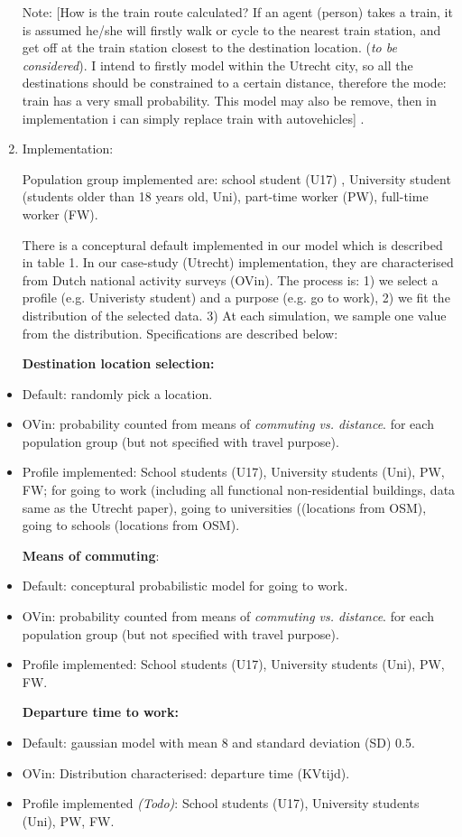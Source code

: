 \documentclass[]{article}
\begin{document}
\begin{enumerate}
  Note: {[}How is the train route calculated? If an agent (person) takes
  a train, it is assumed he/she will firstly walk or cycle to the
  nearest train station, and get off at the train station closest to the
  destination location. (\emph{to be considered}). I intend to firstly
  model within the Utrecht city, so all the destinations should be
  constrained to a certain distance, therefore the mode: train has a
  very small probability. This model may also be remove, then in
  implementation i can simply replace train with autovehicles{]} .
\item
  Implementation:

  Population group implemented are: school student (U17) , University
  student (students older than 18 years old, Uni), part-time worker
  (PW), full-time worker (FW).

  There is a conceptural default implemented in our model which is
  described in table 1. In our case-study (Utrecht) implementation, they
  are characterised from Dutch national activity surveys (OVin). The
  process is: 1) we select a profile (e.g. Univeristy student) and a
  purpose (e.g. go to work), 2) we fit the distribution of the selected
  data. 3) At each simulation, we sample one value from the
  distribution. Specifications are described below:

  \textbf{Destination location selection:}
\end{enumerate}

\begin{itemize}
\item
  Default: randomly pick a location.
\item
  OVin: probability counted from means of \emph{commuting vs. distance}.
  for each population group (but not specified with travel purpose).
\item
  Profile implemented: School students (U17), University students (Uni),
  PW, FW; for going to work (including all functional non-residential
  buildings, data same as the Utrecht paper), going to universities
  ((locations from OSM), going to schools (locations from OSM).

  \textbf{Means of commuting}:
\item
  Default: conceptural probabilistic model for going to work.
\item
  OVin: probability counted from means of \emph{commuting vs. distance}.
  for each population group (but not specified with travel purpose).
\item
  Profile implemented: School students (U17), University students (Uni),
  PW, FW.

  \textbf{Departure time to work:} 
\item
  Default: gaussian model with mean 8 and standard deviation (SD) 0.5.
\item
  OVin: Distribution characterised: departure time (KVtijd). 
\item
  Profile implemented \emph{(Todo)}: School students (U17), University
  students (Uni), PW, FW. 
\end{itemize}
\end{document}
